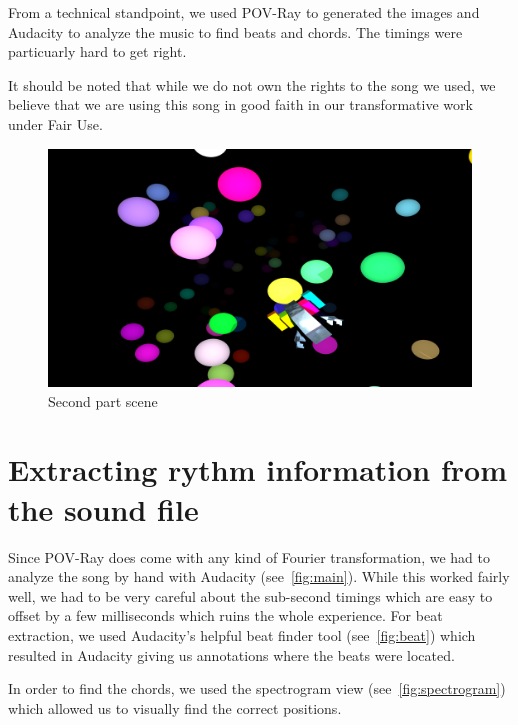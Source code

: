 \documentclass[a4paper, 12pt]{scrartcl}
\begin{document}
    From a technical standpoint, we used POV-Ray to generated the images and Audacity to analyze
    the music to find beats and chords. The timings were particuarly hard to get right.

    It should be noted that while we do not own the rights to the song we used, we believe that we
    are using this song in good faith in our transformative work under Fair Use.

    \begin{figure}[H]
        \centering
        \includegraphics[scale=0.23]{render_part2}
        \caption{Second part scene}
        \label{fig:part2}
    \end{figure}

    \section{Extracting rythm information from the sound file}

    Since POV-Ray does come with any kind of Fourier transformation, we had to analyze the song by
    hand with Audacity (see~\ref{fig:main}). While this worked fairly well, we had to be very
    careful about the sub-second timings which are easy to offset by a few milliseconds which ruins
    the whole experience. For beat extraction, we used Audacity's helpful beat finder tool
    (see~\ref{fig:beat}) which resulted in Audacity giving us annotations where the beats were
    located.

    In order to find the chords, we used the spectrogram view (see~\ref{fig:spectrogram}) which
    allowed us to visually find the correct positions.
\end{document}

